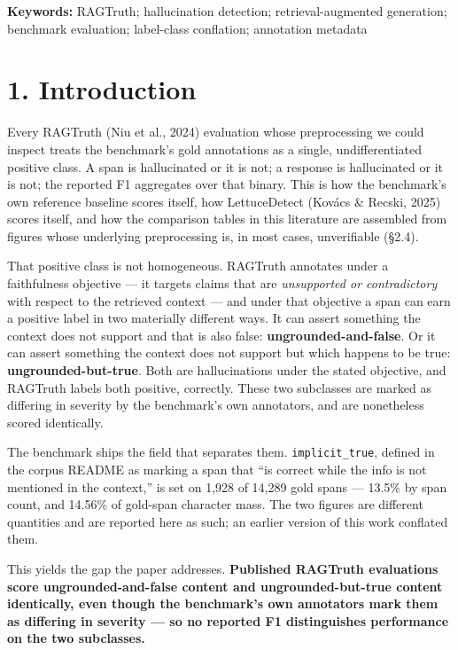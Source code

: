 \documentclass[11pt]{article}
\newcounter{none}
\begin{document}
\textbf{Keywords:} RAGTruth; hallucination detection; retrieval-augmented generation; benchmark
evaluation; label-class conflation; annotation metadata

\section{1. Introduction}\label{introduction}

Every RAGTruth (Niu et al., 2024) evaluation whose preprocessing we could inspect treats the
benchmark's gold annotations as a single, undifferentiated positive class. A span is
hallucinated or it is not; a response is hallucinated or it is not; the reported F1 aggregates
over that binary. This is how the benchmark's own reference baseline scores itself, how
LettuceDetect (Kovács \& Recski, 2025) scores itself, and how the comparison tables in this
literature are assembled from figures whose underlying preprocessing is, in most cases,
unverifiable (§2.4).

That positive class is not homogeneous. RAGTruth annotates under a faithfulness
objective --- it targets claims that are \emph{unsupported or contradictory} with respect to the
retrieved context --- and under that objective a span can earn a positive label in two
materially different ways. It can assert something the context does not support and that is
also false: \textbf{ungrounded-and-false}. Or it can assert something the context does not
support but which happens to be true: \textbf{ungrounded-but-true}. Both are hallucinations under
the stated objective, and RAGTruth labels both positive, correctly. These two subclasses
are marked as differing in severity by the benchmark's own annotators, and are
nonetheless scored identically.

The benchmark ships the field that separates them. \texttt{implicit\_true}, defined in the corpus
README as marking a span that ``is correct while the info is not mentioned in the context,''
is set on 1,928 of 14,289 gold spans --- 13.5\% by span count, and 14.56\% of gold-span
character mass. The two figures are different quantities and are reported here as such;
an earlier version of this work conflated them.

This yields the gap the paper addresses. \textbf{Published RAGTruth evaluations score
ungrounded-and-false content and ungrounded-but-true content identically, even though the
benchmark's own annotators mark them as differing in severity --- so no reported F1
distinguishes performance on the two subclasses.}
\end{document}
